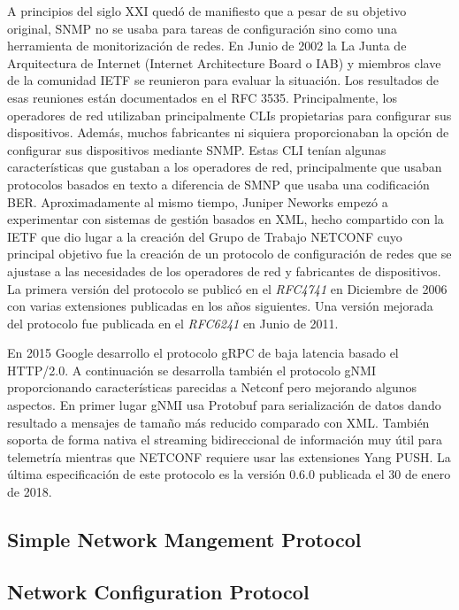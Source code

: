 A principios del siglo XXI quedó de manifiesto que a pesar de su objetivo original, SNMP no se usaba para
tareas de configuración sino como una herramienta de monitorización de redes. En Junio de 2002 la La Junta
de Arquitectura de Internet (Internet Architecture Board o IAB) y miembros clave de la comunidad \gls{IETF}
se reunieron para evaluar la situación. Los resultados de esas reuniones están documentados en el RFC 3535.
Principalmente, los operadores de red utilizaban principalmente \glspl{CLI} propietarias para configurar sus
dispositivos. Además, muchos fabricantes ni siquiera proporcionaban la opción de configurar sus dispositivos
mediante SNMP. Estas \gls{CLI} tenían algunas características que gustaban a los operadores de red,
principalmente que usaban protocolos basados en texto a diferencia de SMNP que usaba una codificación BER.
Aproximadamente al mismo tiempo, Juniper Neworks empezó a experimentar con sistemas de gestión basados en
\gls{XML}, hecho compartido con la \gls{IETF} que dio  lugar a la creación del Grupo de Trabajo NETCONF cuyo
principal objetivo fue la creación de un protocolo de configuración de redes que se ajustase a las necesidades
de los operadores de red y fabricantes de dispositivos. La primera versión del protocolo se publicó en el
\textit{RFC4741} en Diciembre de 2006 con varias extensiones publicadas en los años siguientes. Una versión
mejorada del protocolo fue publicada en el \textit{RFC6241} en Junio de 2011.

En 2015 Google desarrollo el protocolo \gls{gRPC} de baja latencia basado el \gls{HTTP}/2.0. A continuación 
se desarrolla también el protocolo \gls{gNMI} proporcionando características parecidas a Netconf pero 
mejorando algunos aspectos. En primer lugar \gls{gNMI} usa Protobuf para serialización de datos dando resultado 
a mensajes de tamaño más reducido comparado con \gls{XML}. También soporta de forma nativa el streaming 
bidireccional de información muy útil para telemetría mientras que NETCONF requiere usar las extensiones 
Yang PUSH. La última especificación de este protocolo es la versión 0.6.0 publicada el 30 de enero de 2018. 

\subsection{Simple Network Mangement Protocol\label{sec:SNMP}}


\subsection{Network Configuration Protocol\label{sec:NETCONF}}

